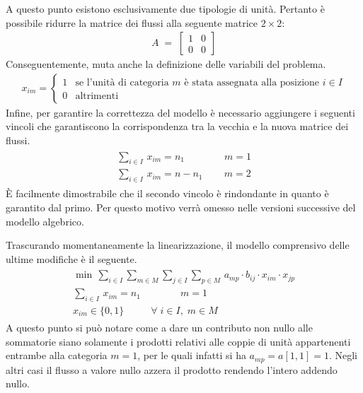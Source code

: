 \newpage \noindent
A questo punto esistono esclusivamente due tipologie di unità. Pertanto è possibile ridurre la matrice dei flussi alla seguente 
matrice $2\times 2$:
\begin{align*}
    A \; = \;
    \begin{bmatrix}
        1 & 0 \\
        0 & 0
    \end{bmatrix}
\end{align*}
Conseguentemente, muta anche la definizione delle variabili del problema.
\begin{align*}
    x_{im} = \begin{cases}  1 & \mbox{se l'unità di categoria } m \mbox{ è stata assegnata alla posizione } i \in I\\ 0 & \mbox{altrimenti} \end{cases}
\end{align*}
Infine, per garantire la correttezza del modello è necessario aggiungere i seguenti vincoli che garantiscono la corrispondenza tra 
la vecchia e la nuova matrice dei flussi.
\begin{align*}
    \begin{array}{l}
        \sum_{i\in I} \, x_{im} = n_1    \qquad\qquad m=1\\
        \sum_{i\in I} \, x_{im} = n-n_1  \,\qquad m=2
    \end{array}
\end{align*}
È facilmente dimostrabile che il secondo vincolo è rindondante in quanto è garantito dal primo. Per questo motivo verrà omesso nelle 
versioni successive del modello algebrico.

\noindent
Trascurando momentaneamente la linearizzazione, il modello comprensivo delle ultime modifiche è il seguente.
\begin{align*}
	\begin{array}{l}
      \min \, \sum_{i\in I} \sum_{m\in M} \sum_{j\in I} \sum_{p\in M} \, a_{mp}\cdot b_{ij}\cdot x_{im}\cdot x_{jp} \\
      \sum_{i\in I} \, x_{im} = n_1    \qquad\qquad m=1\\
      x_{im} \in \{0,1\}           \;\;\,\qquad \forall \; i \in I ,\; m \in M
    \end{array}
\end{align*}
A questo punto si può notare come a dare un contributo non nullo alle sommatorie siano solamente i prodotti relativi alle 
coppie di unità appartenenti entrambe alla categoria $m=1$, per le quali infatti si ha $a_{mp}=a[1,1]=1$. Negli altri casi il flusso 
a valore nullo azzera il prodotto rendendo l'intero addendo nullo. 

